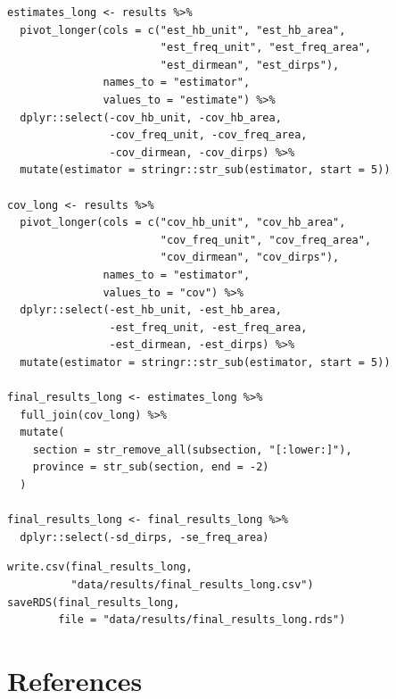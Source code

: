 \documentclass[12pt,twoside]{reedthesis}
\begin{document}
\begin{verbatim}
estimates_long <- results %>%
  pivot_longer(cols = c("est_hb_unit", "est_hb_area",
                        "est_freq_unit", "est_freq_area", 
                        "est_dirmean", "est_dirps"),
               names_to = "estimator",
               values_to = "estimate") %>%
  dplyr::select(-cov_hb_unit, -cov_hb_area,
                -cov_freq_unit, -cov_freq_area,
                -cov_dirmean, -cov_dirps) %>%
  mutate(estimator = stringr::str_sub(estimator, start = 5))

cov_long <- results %>%
  pivot_longer(cols = c("cov_hb_unit", "cov_hb_area",
                        "cov_freq_unit", "cov_freq_area",
                        "cov_dirmean", "cov_dirps"),
               names_to = "estimator",
               values_to = "cov") %>%
  dplyr::select(-est_hb_unit, -est_hb_area,
                -est_freq_unit, -est_freq_area,
                -est_dirmean, -est_dirps) %>%
  mutate(estimator = stringr::str_sub(estimator, start = 5))

final_results_long <- estimates_long %>%
  full_join(cov_long) %>%
  mutate(
    section = str_remove_all(subsection, "[:lower:]"),
    province = str_sub(section, end = -2)
  )

final_results_long <- final_results_long %>%
  dplyr::select(-sd_dirps, -se_freq_area)
\end{verbatim}
\begin{verbatim}
write.csv(final_results_long,
          "data/results/final_results_long.csv")
saveRDS(final_results_long,
        file = "data/results/final_results_long.rds")
\end{verbatim}
\backmatter

\hypertarget{references}{%
\chapter*{References}\label{references}}


\noindent

\setlength{\parindent}{-0.20in}
\setlength{\leftskip}{0.20in}
\setlength{\parskip}{8pt}
\end{document}
